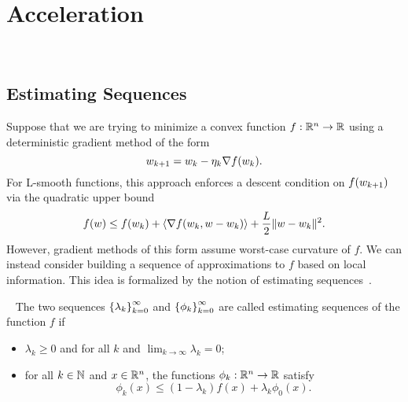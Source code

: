 
\chapter{Acceleration}~\label{ch:acceleration}




\section{Estimating Sequences}

Suppose that we are trying to minimize a convex function \( f : \mathbb{R}^n \rightarrow \mathbb{R} \) using a deterministic gradient method of the form
\[ w_{k+1} = w_k - \eta_k \nabla f(w_k). \]
For L-smooth functions, this approach enforces a descent condition on \( f(w_{k+1}) \) via the quadratic upper bound
\[ f(w) \leq f(w_k) + \left\langle\nabla f(w_k, w - w_k)\right\rangle + \frac{L}{2}\|w - w_k\|^2. \]
However, gradient methods of this form assume worst-case curvature of \( f \).
We can instead consider building a sequence of approximations to \( f \) based on local information.
This idea is formalized by the notion of estimating sequences~\citep{nesterov2004lectures}.\\

\begin{definition}~\label{def:estimating_sequences}
    The two sequences \( \left\{\lambda_k\right\}_{k=0}^\infty \) and \( \left\{\phi_k\right\}_{k=0}^\infty \) are called estimating sequences of the function \( f \) if
    \begin{itemize}
        \item \( \lambda_k \geq 0 \) and for all \( k \) and \( \lim_{k\rightarrow \infty} \lambda_k = 0 \);
        \item for all \( k \in \mathbb{N} \) and \( x \in \mathbb{R}^n \), the functions \( \phi_k: \mathbb{R}^n \rightarrow \mathbb{R} \) satisfy
        \[ \phi_k(x) \leq (1 - \lambda_k) f(x) + \lambda_k \phi_0(x). \]
    \end{itemize}
\end{definition}

